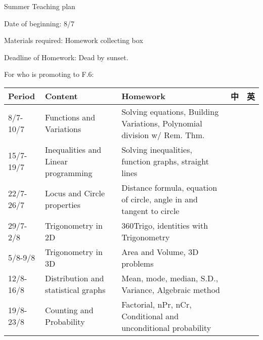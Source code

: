 \documentclass{article}
\begin{document}
    \begin{center}
        Summer Teaching plan
    \end{center}

    Date of beginning: 8/7

    Materials required: Homework collecting box
    
    Deadline of Homework: Dead by sunset.

    For who is promoting to F.6:
    \begin{center}
        \begin{tabular}{|m{2cm}|m{6cm}|m{6cm}|m{1cm}|m{1cm}|}
            \hline
            Period&Content&Homework&中&英\\
            \hline
            8/7-10/7&Functions and Variations&Solving equations, Building Variations, Polynomial division w/ Rem. Thm.&&\\
            \hline
            15/7-19/7&Inequalities and Linear programming&Solving inequalities, function graphs, straight lines&&\\
            \hline
            22/7-26/7&Locus and Circle properties&Distance formula, equation of circle, angle in and tangent to circle&&\\
            \hline
            29/7-2/8&Trigonometry in 2D&360Trigo, identities with Trigonometry&&\\
            \hline
            5/8-9/8&Trigonometry in 3D&Area and Volume, 3D problems&&\\
            \hline
            12/8-16/8&Distribution and statistical graphs&Mean, mode, median, S.D., Variance, Algebraic method&&\\
            \hline
            19/8-23/8&Counting and Probability& Factorial, nPr, nCr, Conditional and unconditional probability&&\\
            \hline
        \end{tabular}
    \end{center}
\end{document}
